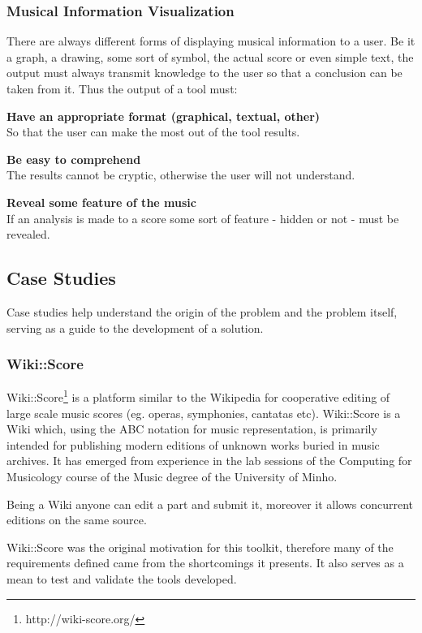\documentclass[main.tex]{subfiles}
\begin{document}
\subsubsection{Musical Information Visualization}

There are always different forms of displaying musical information to a user. Be it a graph, a
drawing, some sort of symbol, the actual score or even simple text, the output must always transmit
knowledge to the user so that a conclusion can be taken from it.
Thus the output of a tool must:

\begin{description}
  \item \textbf{Have an appropriate format (graphical, textual, other)} \hfill\\
    So that the user can make the most out of the tool results.
  \item \textbf{Be easy to comprehend} \hfill\\
    The results cannot be cryptic, otherwise the user will not understand.  
  \item \textbf{Reveal some feature of the music} \hfill\\
    If an analysis is made to a score some sort of feature - hidden or not - must be revealed.
\end{description}

\subsection{Case Studies}

Case studies help understand the origin of the problem and the problem itself, serving as a guide to
the development of a solution.

\subsubsection{Wiki::Score}

Wiki::Score\cite{almeida2012wiki}\footnote{http://wiki-score.org/} is a platform similar to the
Wikipedia for cooperative editing of large scale music scores (eg. operas, symphonies, cantatas
etc). Wiki::Score is a Wiki which, using the ABC notation for music representation, is primarily
intended for publishing modern editions of unknown works buried in music archives. It has emerged
from experience in the lab sessions of the Computing for Musicology course of the Music degree of
the University of Minho.

Being a Wiki anyone can edit a part and submit it, moreover it allows concurrent editions on the
same source.

Wiki::Score was the original motivation for this toolkit, therefore many of the requirements defined
came from the shortcomings it presents. It also serves as a mean to test and validate the tools
developed.
\end{document}
